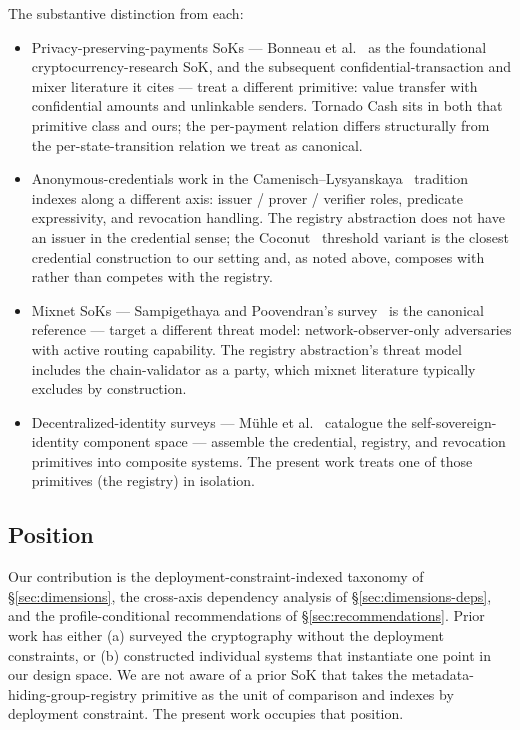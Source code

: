 The substantive distinction from each:
\begin{itemize}
  \item Privacy-preserving-payments SoKs ---
    Bonneau et al.~\cite{bonneau-2015-sok-bitcoin} as the foundational
    cryptocurrency-research SoK, and the subsequent
    confidential-transaction and mixer literature it
    cites --- treat a different primitive: value transfer with
    confidential amounts and unlinkable senders. Tornado Cash sits in
    both that primitive class and ours; the per-payment relation
    differs structurally from the per-state-transition relation we
    treat as canonical.
  \item Anonymous-credentials work in the
    Camenisch--Lysyanskaya~\cite{camenisch-2001-cl} tradition
    indexes along a different axis: issuer / prover / verifier
    roles, predicate expressivity, and revocation handling. The
    registry abstraction does not have an issuer in the credential
    sense; the Coconut~\cite{sonnino-2019-coconut} threshold variant
    is the closest credential construction to our setting and, as
    noted above, composes with rather than competes with the
    registry.
  \item Mixnet SoKs ---
    Sampigethaya and Poovendran's survey~\cite{sampigethaya-2006-mix}
    is the canonical reference --- target a different threat model:
    network-observer-only adversaries with active routing
    capability. The registry abstraction's threat model includes the
    chain-validator as a party, which mixnet literature
    typically excludes by construction.
  \item Decentralized-identity surveys ---
    M\"uhle et al.~\cite{muhle-2018-ssi} catalogue the
    self-sovereign-identity component space --- assemble the
    credential, registry, and revocation primitives into composite
    systems. The present work treats one of those primitives (the
    registry) in isolation.
\end{itemize}

\subsection{Position}

Our contribution is the deployment-constraint-indexed taxonomy of
\S\ref{sec:dimensions}, the cross-axis dependency analysis of
\S\ref{sec:dimensions-deps}, and the profile-conditional
recommendations of \S\ref{sec:recommendations}. Prior work has either
(a) surveyed the cryptography without the deployment constraints, or
(b) constructed individual systems that instantiate one point in our
design space. We are not aware of a prior SoK that takes the
metadata-hiding-group-registry primitive as the unit of comparison
and indexes by deployment constraint. The present work occupies that
position.
